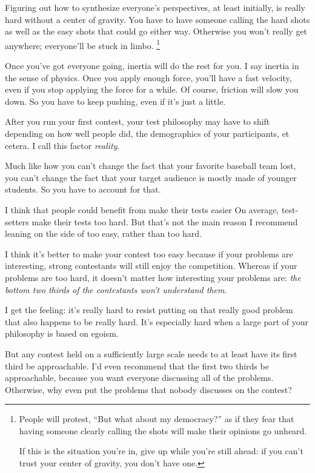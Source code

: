 \documentclass[points=false]{bounce}
\begin{document}
Figuring out how to synthesize
everyone's perspectives, at least initially,
is really hard without a center of gravity.
You have to have someone calling the hard shots
as well as the easy shots that could go either way.
Otherwise you won't really get anywhere;
everyone'll be stuck in limbo.
\footnote{
	People will protest, ``But what about my democracy?''
	as if they fear that having someone clearly calling the shots
	will make their opinions go unheard.
	
	If this is the situation you're in,
	give up while you're still ahead:
	if you can't trust your center of gravity,
	you don't have one.
}

Once you've got everyone going,
inertia will do the rest for you.
I say inertia in the sense of physics.
Once you apply enough force,
you'll have a fast velocity,
even if you stop applying the force for a while.
Of course, friction will slow you down.
So you have to keep pushing, even if it's just a little.

After you run your first contest,
your test philosophy may have to shift
depending on how well people did,
the demographics of your participants,
et cetera.
I call this factor \emph{reality}.

Much like how you can't change
the fact that your favorite baseball team lost,
you can't change the fact
that your target audience is mostly made
of younger students.
So you have to account for that.

I think that people could benefit
from make their tests easier
On average, test-setters make their tests too hard.
But that's not the main reason
I recommend leaning on the side
of too easy, rather than too hard.

I think it's better to make your contest too easy
because if your problems are interesting,
strong contestants will still enjoy the competition.
Whereas if your problems are too hard,
it doesn't matter how interesting your problems are:
\emph{the bottom two thirds of the contestants
won't understand them}.

I get the feeling:
it's really hard to resist putting on
that really good problem
that also happens to be really hard.
It's especially hard when a large
part of your philosophy
is based on egoism.

But any contest held on a sufficiently large scale
needs to at least have its first third be approachable.
I'd even recommend that the first two thirds be approachable,
because you want everyone discussing all of the problems.
Otherwise, why even put the problems
that nobody discusses on the contest?
\end{document}
